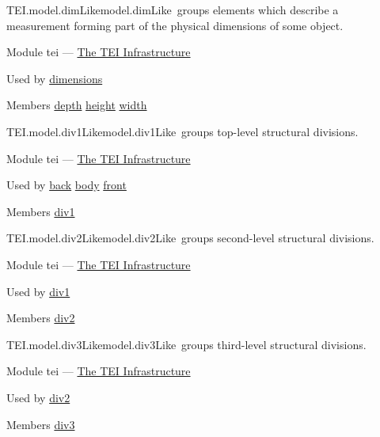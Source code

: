 \begin{reflist}
\item[]\begin{specHead}{TEI.model.dimLike}{model.dimLike} groups elements which describe a measurement forming part of the physical dimensions of some object.\end{specHead} 
    \item[{Module}]
  tei — \hyperref[ST]{The TEI Infrastructure}
    \item[{Used by}]
  \hyperref[TEI.dimensions]{dimensions}
    \item[{Members}]
  \hyperref[TEI.depth]{depth} \hyperref[TEI.height]{height} \hyperref[TEI.width]{width}
\end{reflist}  
\begin{reflist}
\item[]\begin{specHead}{TEI.model.div1Like}{model.div1Like} groups top-level structural divisions.\end{specHead} 
    \item[{Module}]
  tei — \hyperref[ST]{The TEI Infrastructure}
    \item[{Used by}]
  \hyperref[TEI.back]{back} \hyperref[TEI.body]{body} \hyperref[TEI.front]{front}
    \item[{Members}]
  \hyperref[TEI.div1]{div1}
\end{reflist}  
\begin{reflist}
\item[]\begin{specHead}{TEI.model.div2Like}{model.div2Like} groups second-level structural divisions.\end{specHead} 
    \item[{Module}]
  tei — \hyperref[ST]{The TEI Infrastructure}
    \item[{Used by}]
  \hyperref[TEI.div1]{div1}
    \item[{Members}]
  \hyperref[TEI.div2]{div2}
\end{reflist}  
\begin{reflist}
\item[]\begin{specHead}{TEI.model.div3Like}{model.div3Like} groups third-level structural divisions.\end{specHead} 
    \item[{Module}]
  tei — \hyperref[ST]{The TEI Infrastructure}
    \item[{Used by}]
  \hyperref[TEI.div2]{div2}
    \item[{Members}]
  \hyperref[TEI.div3]{div3}
\end{reflist}  
